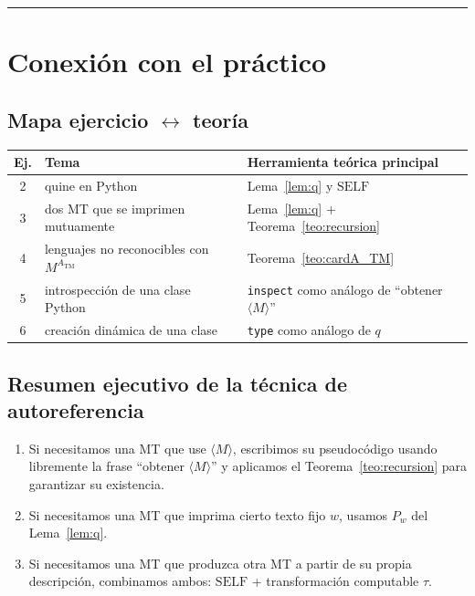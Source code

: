\documentclass[11pt,a4paper]{article}
\theoremstyle{plain}
\theoremstyle{definition}
\theoremstyle{remark}
\newcommand{\TM}{\mathrm{TM}}
\newcommand{\enc}[1]{\langle #1\rangle}
\newcommand{\ATM}{A_{\TM}}
\newcommand{\SELF}{\mathrm{SELF}}
\newcommand{\Pw}[1]{P_{#1}}
\begin{document}
\bigskip\hrule\bigskip

\section{Conexi\'on con el pr\'actico}

\subsection*{Mapa ejercicio $\leftrightarrow$ teor\'ia}

\begin{center}
\begin{tabular}{cll}
\toprule
Ej. & Tema & Herramienta te\'orica principal \\
\midrule
2  & quine en Python                      & Lema~\ref{lem:q} y $\SELF$ \\
3  & dos MT que se imprimen mutuamente    & Lema~\ref{lem:q} + Teorema~\ref{teo:recursion} \\
4  & lenguajes no reconocibles con $M^{\ATM}$ & Teorema~\ref{teo:cardA_TM} \\
5  & introspecci\'on de una clase Python  & \texttt{inspect} como an\'alogo de ``obtener $\enc{M}$'' \\
6  & creaci\'on din\'amica de una clase   & \texttt{type} como an\'alogo de $q$ \\
\bottomrule
\end{tabular}
\end{center}

\subsection*{Resumen ejecutivo de la t\'ecnica de autoreferencia}

\begin{enumerate}
  \item Si necesitamos una MT que use $\enc{M}$, escribimos su pseudoc\'odigo
        usando libremente la frase ``obtener $\enc{M}$'' y aplicamos el
        Teorema~\ref{teo:recursion} para garantizar su existencia.
  \item Si necesitamos una MT que imprima cierto texto fijo $w$, usamos
        $\Pw{w}$ del Lema~\ref{lem:q}.
  \item Si necesitamos una MT que produzca otra MT a partir de su propia
        descripci\'on, combinamos ambos: $\SELF$ + transformaci\'on
        computable $\tau$.
\end{enumerate}
\end{document}
